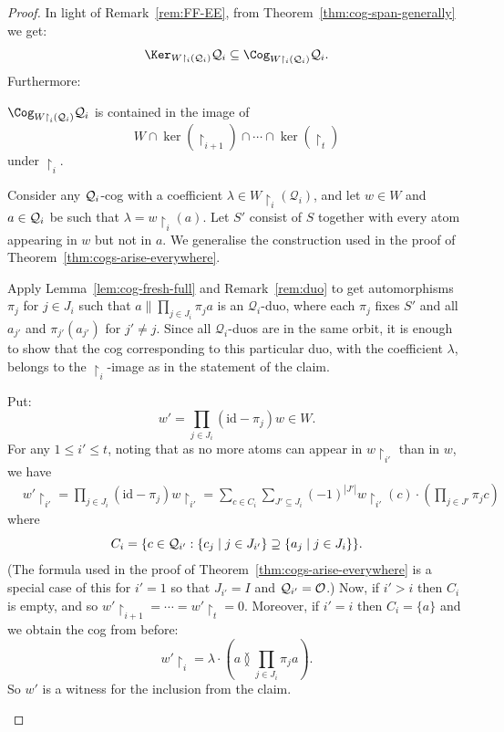 \begin{proof}
In light of Remark~\ref{rem:FF-EE}, from Theorem~\ref{thm:cog-span-generally} we get: 
\[\Ker_{W {\restriction_{i}} (\mathcal{Q}_{i})} \mathcal{Q}_{i} \subseteq \Cog_{W {\restriction_{i}} (\mathcal{Q}_{i})} \mathcal{Q}_{i}.\]
Furthermore:
\begin{claim}\label{claim:cogs-arise-everywhere}
    $\Cog_{W {\restriction}_{i} (\mathcal{Q}_{i})} \mathcal{Q}_{i}$ is contained in
    the image of \[
        W \cap \ker(\restriction_{i+1}) \cap \cdots \cap \ker(\restriction_t)
    \] under $\restriction_{i}$. 
\end{claim}
\begin{claimproof}
    Consider any ${\cal Q}_i$-cog with a coefficient $\lambda\in W {\restriction_{i}} (\mathcal{Q}_{i})$, and let $w\in W$ and $a\in{\cal Q}_i$ be such that $\lambda = w{\restriction_{i}}(a)$.
    Let $S'$ consist of $S$ together with every atom appearing in $w$ but not in $a$.
    We generalise the construction used in the proof of Theorem~\ref{thm:cogs-arise-everywhere}.
    
    Apply Lemma~\ref{lem:cog-fresh-full} and Remark~\ref{rem:duo} to get automorphisms $\pi_j$ for $j \in J_i$ such that $a \parallel \prod_{j \in J_i} \pi_j a$ is an $\mathcal{Q}_i$-duo, 
    where each $\pi_j$ fixes $S'$ and all $a_{j'}$ and $\pi_{j'}(a_{j'})$ for $j'\neq j$. Since all $\mathcal{Q}_i$-duos are in the same orbit, it is enough to show that the cog corresponding to this particular duo, with the coefficient $\lambda$, belongs to the $\restriction_i$-image as in the statement of the claim.
    
    
    Put: \[
        w' = \prod_{j \in J_{i}} (\mathrm{id} - \pi_j) w \in W.
    \]
    For any $1 \leq i' \leq t$, noting that as no more atoms can appear in $w{\restriction_{i'}}$ than in $w$, we have
    \begin{align*}
        &w' {\restriction_{i'}}
        = \prod_{j \in J_{i}} (\mathrm{id} - \pi_j) w {\restriction_{i'}} 
        = \sum_{c \in C_i} \sum_{J' \subseteq J_i} (-1)^{|J'|}  
            w {\restriction_{i'}}(c) \cdot \left(\prod_{j \in J'} \pi_j c\right)
    \end{align*}
    where
        \[C_i = \{ c\in{\cal Q}_{i'} : \{c_j\mid j\in J_{i'}\} \supseteq \{a_j \mid j\in J_i\} \}.
    \]
    (The formula used in the proof of Theorem~\ref{thm:cogs-arise-everywhere} is a special case of this for $i'=1$ so that $J_{i'}=I$ and ${\cal Q}_{i'}={\cal O}$.) Now, if $i'>i$ then $C_i$ is empty, and so $w' {\restriction_{i+1}} = \cdots = w' {\restriction_{t}} = 0$. Moreover, if $i'=i$ then $C_i = \{a\}$ and we obtain the cog from before:
    \[
        w' {\restriction_{i}} = \lambda \cdot \left(a \between \prod_{j \in J_{i}} \pi_j a\right).
    \]
So $w'$ is a witness for the inclusion from the claim.
\end{claimproof}


\end{proof}
